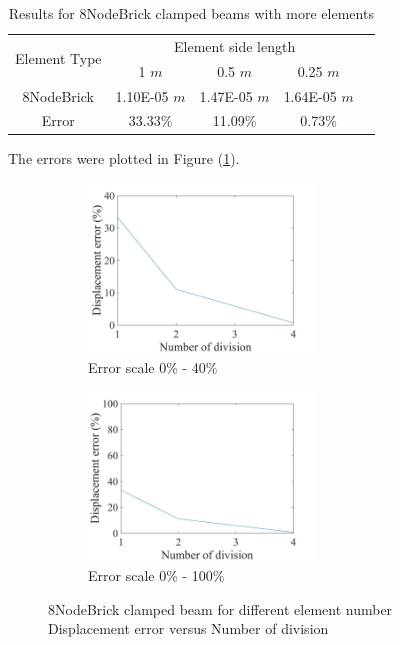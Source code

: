 \documentclass[fleqn,11pt]{article}
\begin{document}
\begin{table}[H]
  \centering
  \caption{Results for 8NodeBrick clamped beams with more elements}
  \label{table Results for 8NodeBrick clamped beams with more elements}
  \begin{tabular}{|c|c|c|c|c|}
    \hline 
    \multirow{2}{*}{Element Type} 
       & \multicolumn{3}{|c|}{Element side length} \\ \cline{2-4}
       & 1 $m$ & 0.5 $m$ & 0.25 $m$ \\                              \hline
8NodeBrick & 1.10E-05 $m$ & 1.47E-05 $m$ & 1.64E-05 $m$ \\ \hline
Error      & 33.33\%  & 11.09\%  & 0.73\%   \\ \hline
  \end{tabular}
\end{table}

The errors were plotted in Figure (\ref{fig error 8NodeBrick clamped beam for different element number}).

\begin{figure}[H]
  \begin{subfigure}{0.5\textwidth}
    \centering
    \includegraphics[width=6cm]{../Figure-files/error8brick_clamped_beam_diff_element.jpeg}
    \caption{Error scale 0\% - 40\%}
  \end{subfigure}
  \begin{subfigure}{0.5\textwidth}
    \centering
    \includegraphics[width=6cm]{../Figure-files/error8brick_clamped_beam_diff_element100.jpeg}
    \caption{Error scale 0\% - 100\%}
  \end{subfigure}
  \captionsetup{justification=centering,margin=3cm}
  \caption{8NodeBrick clamped beam for different element number\\
      Displacement error   versus   Number of division}
  \label{fig error 8NodeBrick clamped beam for different element number}
\end{figure}
\end{document}
